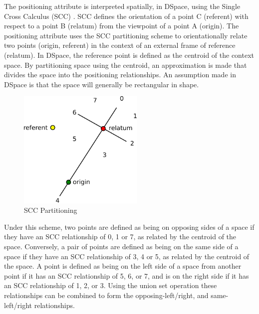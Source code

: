 \documentclass[12pt]{ucthesis}
\begin{document}
The positioning attribute is interpreted spatially, in DSpace, using the Single Cross Calculus (SCC) \cite{Freksa92usingorientation}. SCC defines the orientation of a point C (referent) with respect to a point B (relatum) from the viewpoint of a point A (origin). The positioning attribute uses the SCC partitioning scheme to orientationally relate two points (origin, referent) in the context of an external frame of reference (relatum). In DSpace, the reference point is defined as the centroid of the context space. By partitioning space using the centroid, an approximation is made that divides the space into the positioning relationships. An assumption made in DSpace is that the space will generally be rectangular in shape.

\begin{figure}[H]
\centering
\includegraphics[width=60mm]{scc}
\caption{SCC Partitioning}
\label{scc}
\end{figure}

Under this scheme, two points are defined as being on opposing sides of a space if they have an SCC relationship of 0, 1 or 7, as related by the centroid of the space. Conversely, a pair of points are defined as being on the same side of a space if they have an SCC relationship of 3, 4 or 5, as related by the centroid of the  space. A point is defined as being on the left side of a space from another point if it has an SCC relationship of 5, 6, or 7, and is on the right side if it has an SCC relationship of 1, 2, or 3. Using the union set operation these relationships can be combined to form the opposing-left/right, and same-left/right relationships.
\end{document}
